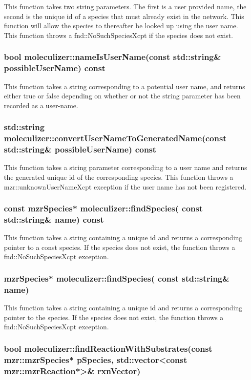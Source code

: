 This function takes two string parameters.  The first is a user
provided name, the second is the unique id of a species that must
already exist in the network.  This function will allow the species to
thereafter be looked up using the user name.  This function throws a
fnd::NoSuchSpeciesXcpt if the species does not exist.  

\subsubsection{bool moleculizer::nameIsUserName(const std::string\&
  possibleUserName) const}
This function takes a string corresponding to a potential user name,
and returns either true or false depending on whether or not the
string parameter has been recorded as a user-name.  

\subsubsection{std::string
  moleculizer::convertUserNameToGeneratedName(const std::string\&
  possibleUserName) const}

This function takes a string parameter corresponding to a user name
and returns the generated unique id of the corresponding species.
This function throws a mzr::unknownUserNameXcpt exception if the user
name has not been registered.  

\subsubsection{ const mzrSpecies* moleculizer::findSpecies( const
  std::string\& name) const  }

This function takes a string containing a unique id and returns a
corresponding pointer to a const species.  If the species does not exist,
the function throws a fnd::NoSuchSpeciesXcpt exception.  


\subsubsection{ mzrSpecies* moleculizer::findSpecies( const
  std::string\& name) }

This function takes a string containing a unique id and returns a
corresponding pointer to the species.  If the species does not exist,
the function throws a fnd::NoSuchSpeciesXcpt exception.  

\subsubsection{bool
  moleculizer::findReactionWithSubstrates(const mzr::mzrSpecies*
  pSpecies, std::vector<const mzr::mzrReaction*>\& rxnVector) }

